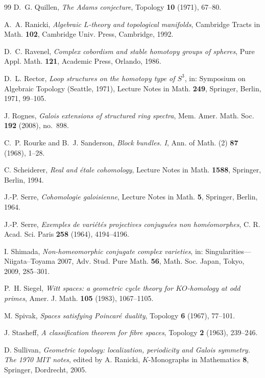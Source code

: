 \documentclass[11pt]{amsart}
\theoremstyle{plain}
\theoremstyle{definition}
\numberwithin{equation}{section}
\begin{document}
\begin{thebibliography}{99}
D.~G. Quillen, \emph{The Adams conjecture}, Topology \textbf{10} (1971), 67--80.

A.~A. Ranicki, \emph{Algebraic $L$-theory and topological manifolds}, Cambridge Tracts in Math. \textbf{102}, Cambridge Univ. Press, Cambridge, 1992.

D.~C. Ravenel, \emph{Complex cobordism and stable homotopy groups of spheres}, Pure Appl. Math. \textbf{121}, Academic Press, Orlando, 1986.

D.~L. Rector, \emph{Loop structures on the homotopy type of $S^3$}, in: Symposium on Algebraic Topology (Seattle, 1971), Lecture Notes in Math. \textbf{249}, Springer, Berlin, 1971, 99--105.

J. Rognes, \emph{Galois extensions of structured ring spectra}, Mem. Amer. Math. Soc. \textbf{192} (2008), no.~898.

C.~P. Rourke and B.~J. Sanderson, \emph{Block bundles. I}, Ann. of Math. (2) \textbf{87} (1968), 1--28.

C. Scheiderer, \emph{Real and \'etale cohomology}, Lecture Notes in Math. \textbf{1588}, Springer, Berlin, 1994.

J.-P. Serre, \emph{Cohomologie galoisienne}, Lecture Notes in Math. \textbf{5}, Springer, Berlin, 1964.

J.-P. Serre, \emph{Exemples de vari\'et\'es projectives conjugu\'ees non hom\'eomorphes}, C. R. Acad. Sci. Paris \textbf{258} (1964), 4194--4196.

I. Shimada, \emph{Non-homeomorphic conjugate complex varieties}, in: Singularities---Niigata--Toyama 2007, Adv. Stud. Pure Math. \textbf{56}, Math. Soc. Japan, Tokyo, 2009, 285--301.

P.~H. Siegel, \emph{Witt spaces: a geometric cycle theory for $KO$-homology at odd primes}, Amer. J. Math. \textbf{105} (1983), 1067--1105.

M. Spivak, \emph{Spaces satisfying Poincar\'e duality}, Topology \textbf{6} (1967), 77--101.

J. Stasheff, \emph{A classification theorem for fibre spaces}, Topology \textbf{2} (1963), 239--246.

D. Sullivan, \emph{Geometric topology: localization, periodicity and Galois symmetry. The 1970 MIT notes}, edited by A. Ranicki, $K$-Monographs in Mathematics \textbf{8}, Springer, Dordrecht, 2005.


\end{thebibliography}
\end{document}
